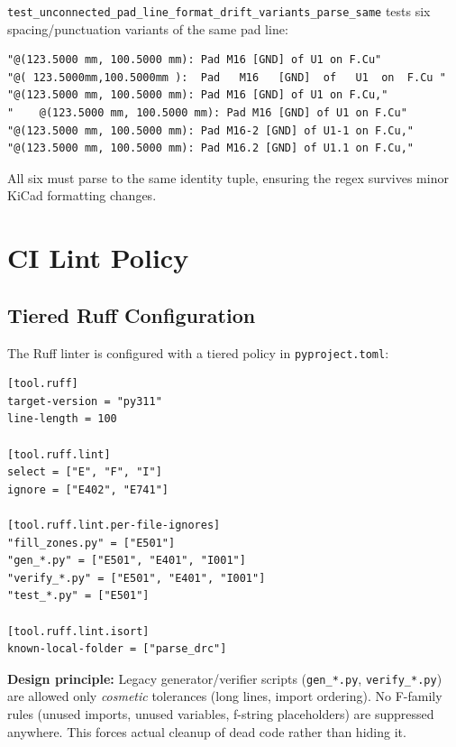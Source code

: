 \documentclass[11pt,a4paper]{article}
\begin{document}
\texttt{test\_unconnected\_pad\_line\_format\_drift\_variants\_parse\_same} tests
six spacing/punctuation variants of the same pad line:

\begin{lstlisting}[caption={Format drift test variants.},label={lst:drift}]
"@(123.5000 mm, 100.5000 mm): Pad M16 [GND] of U1 on F.Cu"
"@( 123.5000mm,100.5000mm ):  Pad   M16   [GND]  of   U1  on  F.Cu "
"@(123.5000 mm, 100.5000 mm): Pad M16 [GND] of U1 on F.Cu,"
"    @(123.5000 mm, 100.5000 mm): Pad M16 [GND] of U1 on F.Cu"
"@(123.5000 mm, 100.5000 mm): Pad M16-2 [GND] of U1-1 on F.Cu,"
"@(123.5000 mm, 100.5000 mm): Pad M16.2 [GND] of U1.1 on F.Cu,"
\end{lstlisting}

All six must parse to the same identity tuple, ensuring the regex survives
minor KiCad formatting changes.

\section{CI Lint Policy}
\label{sec:lint-policy}

\subsection{Tiered Ruff Configuration}

The Ruff linter is configured with a tiered policy in \texttt{pyproject.toml}:

\begin{lstlisting}[style=tomlstyle,caption={Ruff configuration (pyproject.toml).},label={lst:pyproject}]
[tool.ruff]
target-version = "py311"
line-length = 100

[tool.ruff.lint]
select = ["E", "F", "I"]
ignore = ["E402", "E741"]

[tool.ruff.lint.per-file-ignores]
"fill_zones.py" = ["E501"]
"gen_*.py" = ["E501", "E401", "I001"]
"verify_*.py" = ["E501", "E401", "I001"]
"test_*.py" = ["E501"]

[tool.ruff.lint.isort]
known-local-folder = ["parse_drc"]
\end{lstlisting}

\textbf{Design principle:} Legacy generator/verifier scripts (\texttt{gen\_*.py},
\texttt{verify\_*.py}) are allowed only \emph{cosmetic} tolerances (long lines,
import ordering). No F-family rules (unused imports, unused variables, f-string
placeholders) are suppressed anywhere. This forces actual cleanup of dead code
rather than hiding it.
\end{document}
